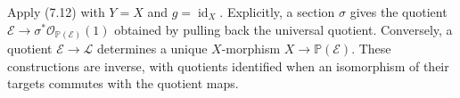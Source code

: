 Apply (7.12) with $Y=X$ and $g=\operatorname{id}_X$. Explicitly, a section $\sigma$ gives the quotient $\mathcal E\to\sigma^*\mathcal O_{\mathbb P(\mathcal E)}(1)$ obtained by pulling back the universal quotient. Conversely, a quotient $\mathcal E\to\mathcal L$ determines a unique $X$-morphism $X\to\mathbb P(\mathcal E)$. These constructions are inverse, with quotients identified when an isomorphism of their targets commutes with the quotient maps.
